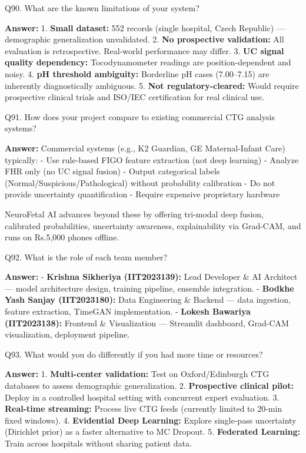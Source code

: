 \documentclass[11pt,a4paper]{article}
\begin{document}
\begin{questionbox}
Q90. What are the known limitations of your system?
\end{questionbox}
\textbf{Answer:} 1. \textbf{Small dataset:} 552 records (single hospital,
Czech Republic) --- demographic generalization unvalidated. 2.
\textbf{No prospective validation:} All evaluation is retrospective.
Real-world performance may differ. 3. \textbf{UC signal quality
dependency:} Tocodynamometer readings are position-dependent and noisy.
4. \textbf{pH threshold ambiguity:} Borderline pH cases (7.00--7.15) are
inherently diagnostically ambiguous. 5. \textbf{Not regulatory-cleared:}
Would require prospective clinical trials and ISO/IEC certification for
real clinical use.

\begin{questionbox}
Q91. How does your project compare to existing commercial CTG
analysis systems?
\end{questionbox}
\textbf{Answer:} Commercial systems (e.g., K2 Guardian, GE Maternal-Infant
Care) typically: - Use rule-based FIGO feature extraction (not deep
learning) - Analyze FHR only (no UC signal fusion) - Output categorical
labels (Normal/Suspicious/Pathological) without probability calibration
- Do not provide uncertainty quantification - Require expensive
proprietary hardware

NeuroFetal AI advances beyond these by offering tri-modal deep fusion,
calibrated probabilities, uncertainty awareness, explainability via
Grad-CAM, and runs on Rs.5,000 phones offline.

\begin{questionbox}
Q92. What is the role of each team member?
\end{questionbox}
\textbf{Answer:} - \textbf{Krishna Sikheriya (IIT2023139):} Lead Developer \&
AI Architect --- model architecture design, training pipeline, ensemble
integration. - \textbf{Bodkhe Yash Sanjay (IIT2023180):} Data
Engineering \& Backend --- data ingestion, feature extraction, TimeGAN
implementation. - \textbf{Lokesh Bawariya (IIT2023138):} Frontend \&
Visualization --- Streamlit dashboard, Grad-CAM visualization,
deployment pipeline.

\begin{questionbox}
Q93. What would you do differently if you had more time or
resources?
\end{questionbox}
\textbf{Answer:} 1. \textbf{Multi-center validation:} Test on
Oxford/Edinburgh CTG databases to assess demographic generalization. 2.
\textbf{Prospective clinical pilot:} Deploy in a controlled hospital
setting with concurrent expert evaluation. 3. \textbf{Real-time
streaming:} Process live CTG feeds (currently limited to 20-min fixed
windows). 4. \textbf{Evidential Deep Learning:} Explore single-pass
uncertainty (Dirichlet prior) as a faster alternative to MC Dropout. 5.
\textbf{Federated Learning:} Train across hospitals without sharing
patient data.
\end{document}
